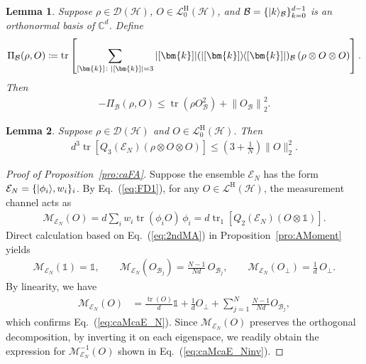 \documentclass[aps,pra,twocolumn,nofootinbib,superscriptaddress,10pt]{revtex4-2}
\newtheorem{lemma}{Lemma}
\DeclarePairedDelimiter{\ket}{\lvert}{\rangle}
\DeclarePairedDelimiter{\bra}{\langle}{\rvert}
\newcommand{\ketbra}[2]{\ket{#1}\mkern-2mu\bra{#2}}
\newcommand{\proj}[1]{\ketbra{#1}{#1}}
\DeclareMathOperator{\tr}{tr}
\newcommand{\bbC}{\mathbb{C}}
\newcommand{\bbone}{\mathds{1}}
\newcommand{\bmk}{\bm{k}}
\newcommand{\caB}{\mathcal{B}}
\newcommand{\caD}{\mathcal{D}}
\newcommand{\caE}{\mathcal{E}}
\newcommand{\caH}{\mathcal{H}}
\newcommand{\caL}{\mathcal{L}}
\newcommand{\caM}{\mathcal{M}}
\newcommand{\rmH}{\mathrm{H}}
\newcommand{\eref}[1]{Eq.~\textup{(\ref{#1})}}
\newcommand{\pref}[1]{Proposition~\ref{#1}}
\begin{document}
\begin{lemma}\label{lem:PI3A}
Suppose $\rho\in \caD(\caH)$, $O\in \caL^{\rmH}_0(\caH)$, and $\caB= \{\ket{k}_\caB\}_{k=0}^{d-1}$ is an orthonormal basis of $\bbC^d$. Define
\begin{align}
    \Pi_\caB(\rho, O) \coloneqq \tr\left[\sum_{[\bmk]\colon|[\bmk]|=3} |[\bmk]|(\proj{[\bmk]})_\caB\left(\rho \otimes O\otimes O\right)\right].
\end{align}
Then
\begin{align}\label{eq:PI3A}
    -\Pi_\caB(\rho, O) \le \tr\left(\rho O_\caB^2\right) + \left\|O_\caB\right\|_2^2.
\end{align}
\end{lemma}
\begin{lemma}\label{lem:NRF}
Suppose $\rho\in \caD(\caH)$ and $O\in \caL^{\rmH}_0(\caH)$. Then
\begin{align}\label{eq:7N}
    d^3\tr\left[Q_3(\caE_N)\left(\rho\otimes O\otimes O\right)\right] \le \left(3+\frac{1}{N}\right)\|O\|_2^2.
\end{align}
\end{lemma}

\begin{proof}[Proof of \pref{pro:caFA}]
Suppose the ensemble $\caE_N$ has the form $\caE_N=\{\ket{\phi_i}, w_i\}_i$. 
By \eref{eq:FD1}, for any $O\in \caL^{\rmH}(\caH)$, the measurement channel acts as
\begin{align}
    \caM_{\caE_N}(O) = d \sum_i w_i\tr(\phi_i O)\,\phi_i = d\tr_1\left[Q_2(\caE_N)\left(O\otimes \bbone\right)\right].
\end{align}
Direct calculation based on \eref{eq:2ndMA} in \pref{pro:AMoment} yields
\begin{align}
    \caM_{\caE_N}(\bbone)=\bbone,\qquad \caM_{\caE_N}(O_{\caB_j})=\frac{N-1}{Nd}\,O_{\caB_j},\qquad \caM_{\caE_N}(O_\perp)=\frac{1}{d}\,O_\perp.
\end{align}
By linearity, we have
\begin{align}
\caM_{\caE_N}(O) &= \frac{\tr(O)}{d}\bbone+\frac{1}{d}O_{\perp} + 
    \sum_{j=1}^{N}\frac{N-1}{Nd}O_{\caB_j},
\end{align}
which confirms \eref{eq:caMcaE_N}. Since $\caM_{\caE_N}(O)$ preserves the orthogonal decomposition, by inverting it on each eigenspace, we readily obtain the expression for $\caM_{\caE_N}^{-1}(O)$ shown in \eref{eq:caMcaE_Ninv}. 
\end{proof}
\end{document}
